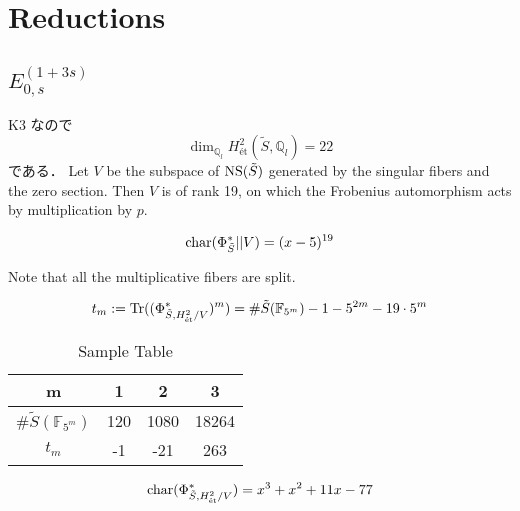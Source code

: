 \documentclass[main]{subfiles}
\begin{document}
\chapter{Reductions}
\section{$E_{0,s}^{(1 + 3s)}$}

K3 なので
\begin{equation}
    \dim_{\mathbb{Q}_{l}} H_{\text{\'et}}^{2}(\tilde{S}, \mathbb{Q}_{l}) = 22
\end{equation}
である．
Let $V$ be the subspace of $\operatorname{NS}(\tilde{S})$ generated by the singular fibers and the zero section.
Then $V$ is of rank 19, on which the Frobenius automorphism acts by multiplication by $p$.

\begin{equation}
    \operatorname{char} (\Phi_{\tilde{S}}^{*} | \vert V) = (x - 5)^{19}
\end{equation}

Note that all the multiplicative fibers are split.

\begin{equation}
    t_{m} := \operatorname{Tr}((\Phi_{\tilde{S},H_{\text{\'et}}^{2} / V}^{*})^{m}) = \# \tilde{S}(\mathbb{F}_{5^{m}}) - 1 - 5^{2m} - 19 \cdot 5^{m}
\end{equation}

\begin{table}[h]
    \centering
    \caption{Sample Table}
    \begin{tabular}{|c|c|c|c|}
        \hline
        m                                & 1   & 2    & 3     \\
        \hline
        $\# \tilde{S}(\mathbb{F}_{5^m})$ & 120 & 1080 & 18264 \\
        \hline
        $t_m$                            & -1  & -21  & 263   \\
        \hline
    \end{tabular}
    \label{tab:sample}
\end{table}

\begin{equation}
    \operatorname{char}(\Phi_{\tilde{S},H_{\text{\'et}}^{2} / V}^{*}) = x^{3} + x^{2} + 11 x - 77
\end{equation}
\end{document}
